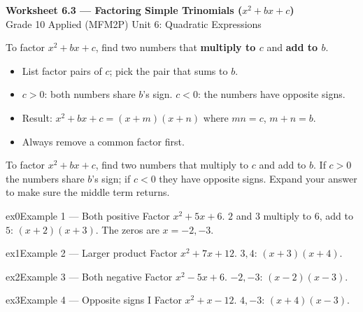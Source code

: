 \documentclass[11pt]{article}
\begin{document}
\begin{center}
{\LARGE\bfseries\color{titleblue}Worksheet 6.3 --- Factoring Simple Trinomials ($x^2+bx+c$)}\\[2pt]
{\small Grade 10 Applied (MFM2P) \textperiodcentered{} Unit 6: Quadratic Expressions}
\end{center}

\begin{ideabox}
To factor $x^2+bx+c$, find two numbers that \textbf{multiply to $c$} and \textbf{add to $b$}.
\begin{itemize}[leftmargin=*,itemsep=2pt]
  \item List factor pairs of $c$; pick the pair that sums to $b$.
  \item $c>0$: both numbers share $b$'s sign. $c<0$: the numbers have opposite signs.
  \item Result: $x^2+bx+c=(x+m)(x+n)$ where $mn=c$, $m+n=b$.
  \item Always remove a common factor first.
\end{itemize}
\end{ideabox}

\begin{learnbox}
To factor $x^2+bx+c$, find two numbers that multiply to $c$ and add to $b$.
If $c>0$ the numbers share $b$'s sign; if $c<0$ they have opposite signs.
Expand your answer to make sure the middle term returns.
\end{learnbox}


\begin{example}{ex0}{Example 1 --- Both positive}
Factor $x^2+5x+6$.
\soln $2$ and $3$ multiply to $6$, add to $5$: $(x+2)(x+3)$. The zeros are $x=-2,-3$.
\end{example}

\begin{example}{ex1}{Example 2 --- Larger product}
Factor $x^2+7x+12$.
\soln $3,4$: $(x+3)(x+4).$
\end{example}

\begin{example}{ex2}{Example 3 --- Both negative}
Factor $x^2-5x+6$.
\soln $-2,-3$: $(x-2)(x-3).$
\end{example}

\begin{example}{ex3}{Example 4 --- Opposite signs I}
Factor $x^2+x-12$.
\soln $4,-3$: $(x+4)(x-3).$
\end{example}
\end{document}
